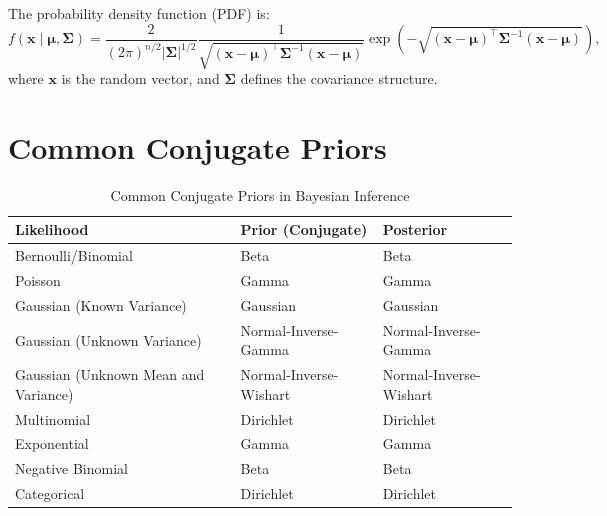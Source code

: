 The probability density function (PDF) is:
\[
    f(\mathbf{x} \mid \boldsymbol{\mu}, \boldsymbol{\Sigma}) = \frac{2}{(2\pi)^{n/2} |\boldsymbol{\Sigma}|^{1/2}}
    \frac{1}{\sqrt{(\mathbf{x} - \boldsymbol{\mu})^\top \boldsymbol{\Sigma}^{-1} (\mathbf{x} - \boldsymbol{\mu})}}
    \exp\left(-\sqrt{(\mathbf{x} - \boldsymbol{\mu})^\top \boldsymbol{\Sigma}^{-1} (\mathbf{x} - \boldsymbol{\mu})}\right),
\]
where $\mathbf{x}$ is the random vector, and $\boldsymbol{\Sigma}$ defines the covariance structure.



\section{Common Conjugate Priors}
\begin{table}[h!]
\centering
\begin{tabular*}{\textwidth}{@{\extracolsep{\fill}}lll@{}}
    \toprule
    \textbf{Likelihood}                  & \textbf{Prior (Conjugate)} & \textbf{Posterior}     \\ \midrule
    Bernoulli/Binomial                   & Beta                       & Beta                   \\
    Poisson                              & Gamma                      & Gamma                  \\
    Gaussian (Known Variance)            & Gaussian                   & Gaussian               \\
    Gaussian (Unknown Variance)          & Normal-Inverse-Gamma       & Normal-Inverse-Gamma   \\
    Gaussian (Unknown Mean and Variance) & Normal-Inverse-Wishart     & Normal-Inverse-Wishart \\
    Multinomial                          & Dirichlet                  & Dirichlet              \\
    Exponential                          & Gamma                      & Gamma                  \\
    Negative Binomial                    & Beta                       & Beta                   \\
    Categorical                          & Dirichlet                  & Dirichlet              \\
    \bottomrule
\end{tabular*}
\vspace{3em}
\caption{Common Conjugate Priors in Bayesian Inference}
\label{tab:conjugate_priors}
\end{table}
